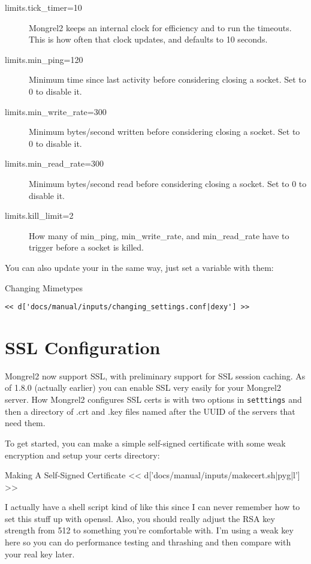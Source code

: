 \begin{description}
\item[limits.tick\_timer=10] Mongrel2 keeps an internal clock for efficiency and to run the
timeouts.  This is how often that clock updates, and defaults to 10 seconds.

\item[limits.min\_ping=120] Minimum time since last activity before considering closing a socket.  Set to 0 to disable it.
\item[limits.min\_write\_rate=300] Minimum bytes/second written before considering closing a socket. Set to 0 to disable it.
\item[limits.min\_read\_rate=300] Minimum bytes/second read before considering closing a socket. Set to 0 to disable it.
\item[limits.kill\_limit=2] How many of min\_ping, min\_write\_rate, and min\_read\_rate have to trigger before a socket is killed.
\end{description}


You can also update your  in the same way, just set a variable with them:

\begin{code}{Changing Mimetypes}
\begin{lstlisting}
<< d['docs/manual/inputs/changing_settings.conf|dexy'] >>
\end{lstlisting}
\end{code}


\section{SSL Configuration}

Mongrel2 now support SSL, with preliminary support for SSL session caching.  As of 
1.8.0 (actually earlier) you can enable SSL very easily for your Mongrel2 server.
How Mongrel2 configures SSL certs is with two options in \verb|setttings| and then
a directory of .crt and .key files named after the UUID of the servers that need them.

To get started, you can make a simple self-signed certificate with some weak encryption
and setup your certs directory:

\begin{code}{Making A Self-Signed Certificate}
<< d['docs/manual/inputs/makecert.sh|pyg|l'] >>
\end{code}

I actually have a shell script kind of like this since I can never remember how 
to set this stuff up with openssl.  Also, you should really adjust the RSA key
strength from 512 to something you're comfortable with.  I'm using a weak
key here so you can do performance testing and thrashing and then compare with
your real key later.

